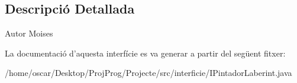 \subsection{Descripció Detallada}
\begin{DoxyAuthor}{Autor}
Moises 
\end{DoxyAuthor}


La documentació d'aquesta interfície es va generar a partir del següent fitxer\+:\begin{DoxyCompactItemize}
\item 
/home/oscar/\+Desktop/\+Proj\+Prog/\+Projecte/src/interficie/I\+Pintador\+Laberint.\+java\end{DoxyCompactItemize}
